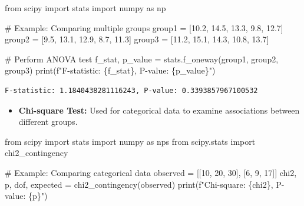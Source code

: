 \documentclass[
  letterpaper,
  DIV=11,
  numbers=noendperiod]{scrreprt}
\newenvironment{Shaded}{\begin{snugshade}}{\end{snugshade}}
\newcommand{\BuiltInTok}[1]{\textcolor[rgb]{0.00,0.23,0.31}{#1}}
\newcommand{\CommentTok}[1]{\textcolor[rgb]{0.37,0.37,0.37}{#1}}
\newcommand{\DecValTok}[1]{\textcolor[rgb]{0.68,0.00,0.00}{#1}}
\newcommand{\FloatTok}[1]{\textcolor[rgb]{0.68,0.00,0.00}{#1}}
\newcommand{\ImportTok}[1]{\textcolor[rgb]{0.00,0.46,0.62}{#1}}
\newcommand{\NormalTok}[1]{\textcolor[rgb]{0.00,0.23,0.31}{#1}}
\newcommand{\OperatorTok}[1]{\textcolor[rgb]{0.37,0.37,0.37}{#1}}
\newcommand{\SpecialCharTok}[1]{\textcolor[rgb]{0.37,0.37,0.37}{#1}}
\newcommand{\SpecialStringTok}[1]{\textcolor[rgb]{0.13,0.47,0.30}{#1}}
\providecommand{\tightlist}{%
  \setlength{\itemsep}{0pt}\setlength{\parskip}{0pt}}\usepackage{longtable,booktabs,array}
\begin{document}
\begin{Shaded}
\begin{Highlighting}[]
\ImportTok{from}\NormalTok{ scipy }\ImportTok{import}\NormalTok{ stats}
\ImportTok{import}\NormalTok{ numpy }\ImportTok{as}\NormalTok{ np}

\CommentTok{\# Example: Comparing multiple groups}
\NormalTok{group1 }\OperatorTok{=}\NormalTok{ [}\FloatTok{10.2}\NormalTok{, }\FloatTok{14.5}\NormalTok{, }\FloatTok{13.3}\NormalTok{, }\FloatTok{9.8}\NormalTok{, }\FloatTok{12.7}\NormalTok{]}
\NormalTok{group2 }\OperatorTok{=}\NormalTok{ [}\FloatTok{9.5}\NormalTok{, }\FloatTok{13.1}\NormalTok{, }\FloatTok{12.9}\NormalTok{, }\FloatTok{8.7}\NormalTok{, }\FloatTok{11.3}\NormalTok{]}
\NormalTok{group3 }\OperatorTok{=}\NormalTok{ [}\FloatTok{11.2}\NormalTok{, }\FloatTok{15.1}\NormalTok{, }\FloatTok{14.3}\NormalTok{, }\FloatTok{10.8}\NormalTok{, }\FloatTok{13.7}\NormalTok{]}

\CommentTok{\# Perform ANOVA test}
\NormalTok{f\_stat, p\_value }\OperatorTok{=}\NormalTok{ stats.f\_oneway(group1, group2, group3)}
\BuiltInTok{print}\NormalTok{(}\SpecialStringTok{f"F{-}statistic: }\SpecialCharTok{\{}\NormalTok{f\_stat}\SpecialCharTok{\}}\SpecialStringTok{, P{-}value: }\SpecialCharTok{\{}\NormalTok{p\_value}\SpecialCharTok{\}}\SpecialStringTok{"}\NormalTok{)}
\end{Highlighting}
\end{Shaded}

\begin{verbatim}
F-statistic: 1.1840438281116243, P-value: 0.3393857967100532
\end{verbatim}

\begin{itemize}
\tightlist
\item
  \textbf{Chi-square Test:} Used for categorical data to examine
  associations between different groups.
\end{itemize}

\begin{Shaded}
\begin{Highlighting}[]
\ImportTok{from}\NormalTok{ scipy }\ImportTok{import}\NormalTok{ stats}
\ImportTok{import}\NormalTok{ numpy }\ImportTok{as}\NormalTok{ nps}
\ImportTok{from}\NormalTok{ scipy.stats }\ImportTok{import}\NormalTok{ chi2\_contingency}

\CommentTok{\# Example: Comparing categorical data}
\NormalTok{observed }\OperatorTok{=}\NormalTok{ [[}\DecValTok{10}\NormalTok{, }\DecValTok{20}\NormalTok{, }\DecValTok{30}\NormalTok{], [}\DecValTok{6}\NormalTok{, }\DecValTok{9}\NormalTok{, }\DecValTok{17}\NormalTok{]]}
\NormalTok{chi2, p, dof, expected }\OperatorTok{=}\NormalTok{ chi2\_contingency(observed)}
\BuiltInTok{print}\NormalTok{(}\SpecialStringTok{f"Chi{-}square: }\SpecialCharTok{\{}\NormalTok{chi2}\SpecialCharTok{\}}\SpecialStringTok{, P{-}value: }\SpecialCharTok{\{}\NormalTok{p}\SpecialCharTok{\}}\SpecialStringTok{"}\NormalTok{)}
\end{Highlighting}
\end{Shaded}
\end{document}
